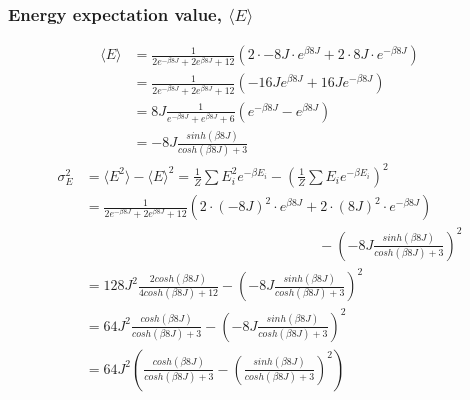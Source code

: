 \documentclass{article}
\begin{document}
\subsubsection*{Energy expectation value, $\langle E \rangle$}
\begin{align}\label{eq:mean_energy}
    \langle E \rangle &= \frac{1}{2e^{-\beta 8J} + 2e^{\beta 8J} + 12} \left(2 \cdot -8J \cdot e^{\beta 8J} + 2\cdot 8J \cdot e^{-\beta8J}\right)\nonumber \\
    &= \frac{1}{2e^{-\beta 8J} + 2e^{\beta 8J} + 12} \left(-16J e^{\beta8J} + 16Je^{-\beta 8J}\right)\nonumber \\
    &= 8J \frac{1}{e^{-\beta 8J} + e^{\beta 8J} + 6}  \left(e^{-\beta8J} - e^{\beta 8J}\right)\nonumber \\
    &= -8J\frac{sinh(\beta 8 J)}{cosh(\beta 8 J) + 3}
\end{align}
\begin{align}\label{eq:mean_energy_var}
    \sigma^2_E &= \langle E^2 \rangle - \langle E \rangle ^2 = \frac{1}{Z}\sum E_i^2 e^{-\beta E_i} - \left( \frac{1}{Z} \sum E_i e^{-\beta E_i} \right)^2\nonumber \\
    &= \frac{1}{2e^{-\beta 8J} + 2e^{\beta 8J} + 12} \left( 2 \cdot (-8J)^2 \cdot e^{\beta 8J} + 2 \cdot (8J)^2 \cdot e^{-\beta 8J} \right)\nonumber \\
    &\hspace{7cm} - \left(-8J\frac{sinh(\beta 8 J)}{cosh(\beta 8 J) + 3}\right)^2\nonumber \\
    &=128J^2\frac{2cosh(\beta 8J)}{4cosh(\beta 8 J) + 12} - \left(-8J\frac{sinh(\beta 8 J)}{cosh(\beta 8 J) + 3}\right)^2\nonumber \\
    &=64J^2\frac{cosh(\beta 8J)}{cosh(\beta 8 J) + 3} - \left(-8J\frac{sinh(\beta 8 J)}{cosh(\beta 8 J) + 3}\right)^2\nonumber \\
    &= 64J^2\left(\frac{cosh(\beta 8J)}{cosh(\beta 8 J) + 3} - \left(\frac{sinh(\beta 8 J)}{cosh(\beta 8 J) + 3}\right)^2\right)
\end{align}

\end{document}
